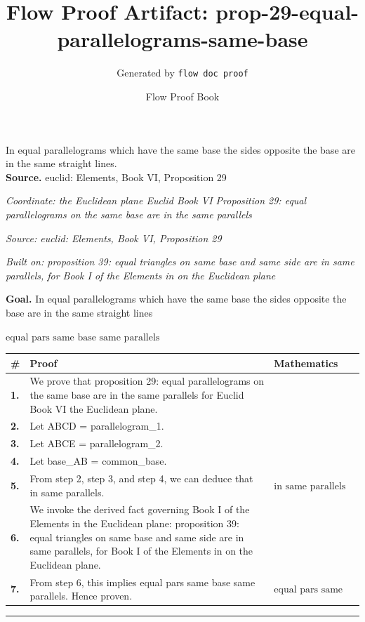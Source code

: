 \documentclass[11pt]{article}
\title{Flow Proof Artifact: prop-29-equal-parallelograms-same-base}
\author{Generated by \texttt{flow doc proof}}
\date{Flow Proof Book}
\theoremstyle{definition}
\begin{document}
\maketitle
In equal parallelograms which have the same base the sides opposite the base are in the same straight lines.\\[0.5em]
\textbf{Source.} euclid: Elements, Book VI, Proposition 29\\[0.5em]
\bigskip
{}\par
\smallskip\noindent\textit{Coordinate: the Euclidean plane \cdot Euclid Book VI \cdot Proposition 29: equal parallelograms on the same base are in the same parallels}\par
\smallskip\noindent\textit{Source: euclid: Elements, Book VI, Proposition 29}\par
\smallskip\noindent\textit{Built on: proposition 39: equal triangles on same base and same side are in same parallels, for Book I of the Elements in on the Euclidean plane}\par
\medskip
\noindent\textbf{Goal.} In equal parallelograms which have the same base the sides opposite the base are in the same straight lines\par
\noindent$\displaystyle \text{equal pars same base same parallels}$\par
\medskip
\noindent
\begin{tabular}{@{} >{\raggedright\arraybackslash}p{} >{\raggedright\arraybackslash}p{} >{\raggedleft\arraybackslash}p{} @{}}
\textbf{\#} & \textbf{Proof} & \textbf{Mathematics} \\
\midrule
\textbf{1.} & We prove that proposition 29: equal parallelograms on the same base are in the same parallels for Euclid Book VI the Euclidean plane. & \\[0.45em]
\textbf{2.} & Let ABCD = parallelogram\_1. & \\[0.45em]
\textbf{3.} & Let ABCE = parallelogram\_2. & \\[0.45em]
\textbf{4.} & Let base\_AB = common\_base. & \\[0.45em]
\textbf{5.} & From step 2, step 3, and step 4, we can deduce that in same parallels. & $\displaystyle \text{in same parallels}$ \\[0.45em]
\textbf{6.} & We invoke the derived fact governing Book I of the Elements in the Euclidean plane: proposition 39: equal triangles on same base and same side are in same parallels, for Book I of the Elements in on the Euclidean plane. & \\[0.45em]
\textbf{7.} & From step 6, this implies equal pars same base same parallels. Hence proven. & $\displaystyle \text{equal pars same base same parallels}$ \\[0.45em]
\bottomrule
\end{tabular}
\label{thm:Geometry-Euclid Book VI-proposition_29_equal_parallelograms_on_the_same_base_are_in_the_same_parallels}
\par\medskip\hrule
\end{document}
